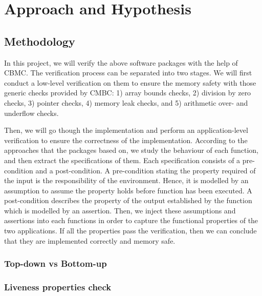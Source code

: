 \chapter{Approach and Hypothesis} %

\section{Methodology}
In this project, we will verify the above software packages with the help of CBMC. The verification process can be separated into two stages. We will first conduct a low-level verification on them to ensure the memory safety with those generic checks provided by CMBC: 1) array bounds checks, 2) division by zero checks, 3) pointer checks, 4) memory leak checks, and 5) arithmetic over- and underflow checks.

Then, we will go though the implementation and perform an application-level verification to ensure the correctness of the implementation. According to the approaches that the packages based on, we study the behaviour of each function, and then extract the specifications of them. Each specification consists of a pre-condition and a post-condition. A pre-condition stating the property required of the input is the responsibility of the environment. Hence, it is modelled by an assumption to assume the property holds before function has been executed. A post-condition describes the property of the output established by the function which is modelled by an assertion. Then, we inject these assumptions and assertions into each functions in order to capture the functional properties of the two applications. If all the properties pass the verification, then we can conclude that they are implemented correctly and memory safe.

\subsection{Top-down vs Bottom-up}

\subsection{Liveness properties check}



